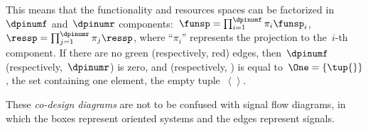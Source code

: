 
This means that the functionality and resources spaces can be factorized in~$\dpinumf$ and~$\dpinumr$ components:~$\funsp=\prod_{i=1}^{\dpinumf}\pi_{i}\funsp_{i}$,~$\ressp=\prod_{j=1}^{\dpinumr}\pi_{j}\ressp$, where ``$\pi_{i}$''
represents the projection to the~$i$-th component. If there are no
green (respectively, red) edges, then~$\dpinumf$ (respectively,~$\dpinumr$)
is zero, and \funsp (respectively, \ressp) is equal to~$\One=\{\tup{} \}$,
the set containing one element, the empty tuple~$\left\langle \right\rangle $.

These \emph{co-design diagrams} are not to be confused with signal
flow diagrams, in which the boxes represent oriented systems and the
edges represent signals.


